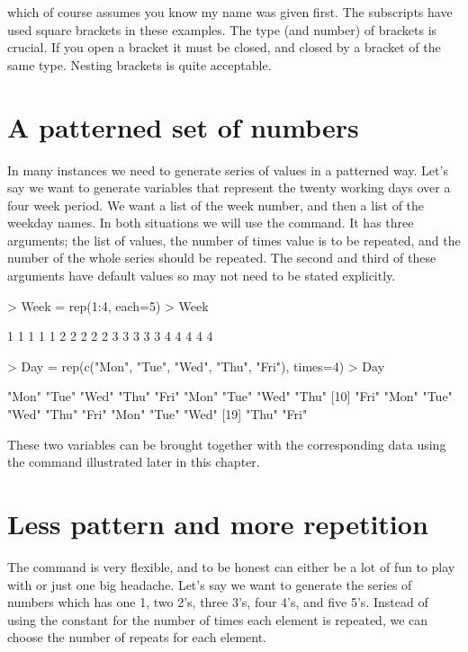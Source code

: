 which of course assumes you know my name was given first. The subscripts have used square brackets in these examples. The type (and number) of brackets is crucial. If you open a bracket it must be closed, and closed by a bracket of the same type. Nesting brackets is quite acceptable. 
 
 
\section{A patterned set of numbers} 
 
In many instances we need to generate series of values in a patterned way. Let's say we want to generate variables that represent the twenty working days over a four week period. We want a list of the week number, and then a list of the weekday names. In both situations we will use the  command. It has three arguments; the list of values, the number of times  value is to be repeated, and the number of  the whole series should be repeated.  
The second and third of these arguments have default values so may not need to be stated explicitly. 

\begin{Schunk}
\begin{Sinput}
> Week = rep(1:4, each=5) 
> Week 
\end{Sinput}
\begin{Soutput}
 [1] 1 1 1 1 1 2 2 2 2 2 3 3 3 3 3 4 4 4 4 4
\end{Soutput}
\begin{Sinput}
> Day = rep(c("Mon", "Tue", "Wed", "Thu", "Fri"), times=4) 
> Day 
\end{Sinput}
\begin{Soutput}
 [1] "Mon" "Tue" "Wed" "Thu" "Fri" "Mon" "Tue" "Wed" "Thu"
[10] "Fri" "Mon" "Tue" "Wed" "Thu" "Fri" "Mon" "Tue" "Wed"
[19] "Thu" "Fri"
\end{Soutput}
\end{Schunk}

These two variables can be brought together with the corresponding data using the  command illustrated later in this chapter. 
 
\section{Less pattern and more repetition} 
 
The  command is very flexible, and to be honest can either be a lot of fun to play with or just one big headache. Let's say we want to generate the series of numbers which has one 1, two 2's, three 3's, four 4's, and five 5's. Instead of using the constant for the number of times each element is repeated, we can choose the number of repeats for each element. 

